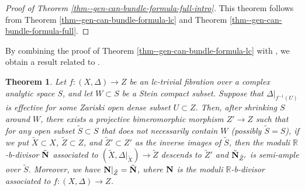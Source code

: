 \documentclass[12pt]{amsart}
\newtheorem{thm}{Theorem}[section]
\theoremstyle{definition}
\begin{document}
\begin{proof}[Proof of Theorem \ref{thm--gen-can-bundle-formula-full-intro}]
This theorem follows from Theorem \ref{thm--gen-can-bundle-formula-lc} and Theorem \ref{thm--gen-can-bundle-formula-full}. 
\end{proof}

By combining the proof of Theorem \ref{thm--gen-can-bundle-formula-lc} with \cite[Theorem 7.3]{bfmt}, we obtain a result related to \cite[7.2.3]{bfmt}.  


\begin{thm}\label{thm--lc-trivial-bfmt}
Let $f \colon (X,\Delta) \to Z$ be an lc-trivial fibration over a complex analytic space $S$, and let $W \subset S$ be a Stein compact subset. 
Suppose that $\Delta|_{f^{-1}(U)}$ is effective for some Zariski open dense subset $U \subset Z$.
Then, after shrinking $S$ around $W$, there exists a projective bimeromorphic morphism $Z' \to Z$ such that for any open subset $\tilde{S} \subset S$ that does not necessarily contain $W$ (possibly $\tilde{S}=S$), if we put $\tilde{X} \subset X$, $\tilde{Z} \subset Z$, and $\tilde{Z}' \subset Z'$ as the inverse images of $\tilde{S}$, then the moduli $\mathbb{R}$-b-divisor $\tilde{\boldsymbol{\rm N}}$ associated to $(\tilde{X},\Delta|_{\tilde{X}}) \to \tilde{Z}$ descends to $\tilde{Z}'$ and $\tilde{\boldsymbol{\rm N}}_{\tilde{Z}'}$ is semi-ample over $\tilde{S}$. 
Moreover, we have $\boldsymbol{\rm N}|_{\tilde{Z}}=\tilde{\boldsymbol{\rm N}}$, where  $\boldsymbol{\rm N}$ is the moduli $\mathbb{R}$-b-divisor associated to $f \colon (X,\Delta) \to Z$. 
\end{thm}
\end{document}
